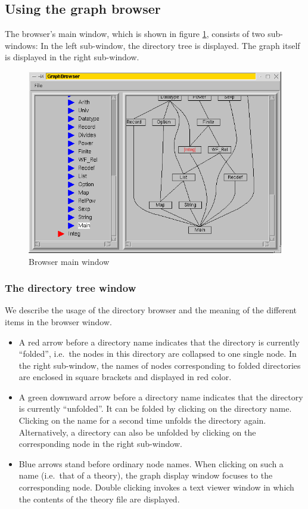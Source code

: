 \subsection{Using the graph browser}

The browser's main window, which is shown in figure
\ref{browserwindow}, consists of two sub-windows: In the left
sub-window, the directory tree is displayed. The graph itself is
displayed in the right sub-window.
\begin{figure}[ht]
  \includegraphics[width=\textwidth]{browser_screenshot}
  \caption{\label{browserwindow} Browser main window}
\end{figure}


\subsubsection*{The directory tree window}

We describe the usage of the directory browser and the meaning of the
different items in the browser window.
\begin{itemize}
  
\item A red arrow before a directory name indicates that the directory
  is currently ``folded'', i.e.~the nodes in this directory are
  collapsed to one single node. In the right sub-window, the names of
  nodes corresponding to folded directories are enclosed in square
  brackets and displayed in red color.
  
\item A green downward arrow before a directory name indicates that
  the directory is currently ``unfolded''. It can be folded by
  clicking on the directory name.  Clicking on the name for a second
  time unfolds the directory again.  Alternatively, a directory can
  also be unfolded by clicking on the corresponding node in the right
  sub-window.
  
\item Blue arrows stand before ordinary node names. When clicking on such a
  name (i.e.\ that of a theory), the graph display window focuses to the
  corresponding node. Double clicking invokes a text viewer window in which
  the contents of the theory file are displayed.

\end{itemize}


